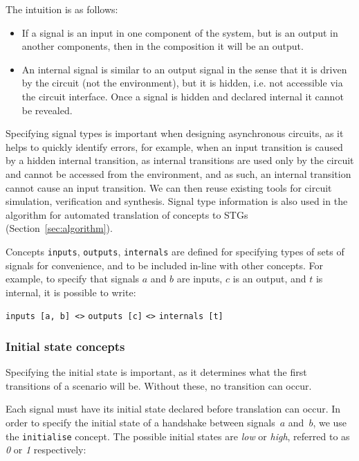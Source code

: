 \documentclass[british,conference,compsoc]{IEEEtran}
\begin{document}
The intuition is as follows:
\begin{itemize}
    \item If a signal is an input in one component of the system, but is an
    output in another components, then in the composition it will be an output.
    \item An internal signal is similar to an output signal in the sense
that it is driven by the circuit (not the environment), but it is hidden, 
i.e. not accessible via the circuit interface. Once a signal is hidden and 
declared internal it cannot be revealed.
\end{itemize}

\noindent Specifying signal types is important when designing asynchronous
circuits, as it helps to quickly identify errors, for example, when an input transition is
caused by a hidden internal transition, as internal transitions are used only by the circuit 
and cannot be accessed from the environment, and as such, an internal transition cannot
cause an input transition. We can then reuse existing tools for circuit
simulation, verification and synthesis. Signal type information is also used
in the algorithm for automated translation of concepts to
STGs (Section~\ref{sec:algorithm}).

Concepts \texttt{inputs}, \texttt{outputs}, \texttt{internals} are defined for
specifying types of sets of signals for convenience, and to be included in-line
with other concepts. For example, to specify that signals $a$ and $b$ are 
inputs, $c$ is an output, and $t$ is internal, it is possible to write:

\begin{center}
\texttt{inputs [a, b] <>} \texttt{outputs [c]} \texttt{<>} \texttt{internals [t]}
\end{center}

\vspace{-4mm}

\subsubsection{Initial state concepts\label{sub:initState}}

Specifying the initial state is important, as it determines what the first 
transitions of a scenario will be. Without these, no transition can occur.

Each signal must have its initial state declared before translation can occur. 
In order to specify the initial state of a handshake between signals~$a$
and~$b$, we use the \texttt{initialise} concept.
The possible initial states are \emph{low} or \emph{high}, referred to as 
\emph{0} or \emph{1} respectively:
\end{document}
